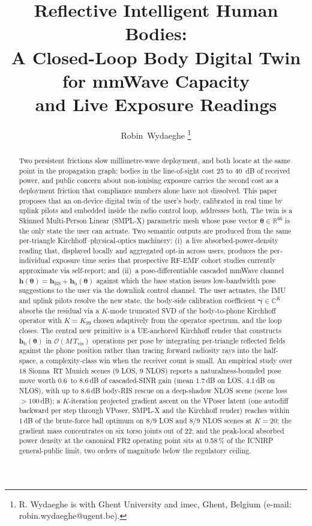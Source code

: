 \documentclass[journal,twocolumn,10pt]{IEEEtran}
\title{Reflective Intelligent Human Bodies:\\
A Closed-Loop Body Digital Twin for mmWave Capacity\\
and Live Exposure Readings}
\author{Robin~Wydaeghe%
  \thanks{R. Wydaeghe is with Ghent University and imec, Ghent, Belgium
  (e-mail: robin.wydaeghe@ugent.be).}}
\theoremstyle{plain}
\theoremstyle{definition}
\theoremstyle{remark}
\newcommand{\hh}{\bm{h}}
\newcommand{\thetab}{\bm{\theta}}
\newcommand{\gammab}{\bm{\gamma}}
\newcommand{\hBS}{\bm{h}_{\mathrm{BS}}}
\newcommand{\hbody}{\bm{h}_{\mathrm{b}}}
\newcommand{\Complex}{\mathbb{C}}
\newcommand{\Reals}{\mathbb{R}}
\begin{document}
\maketitle

\begin{abstract}
Two persistent frictions slow millimetre-wave deployment, and both
locate at the same point in the propagation graph: bodies in the
line-of-sight cost 25 to 40~dB of received power, and public concern
about non-ionising exposure carries the second cost as a deployment
friction that compliance numbers alone have not dissolved. This paper
proposes that an on-device digital twin of the user's body, calibrated
in real time by uplink pilots and embedded inside the radio control
loop, addresses both. The twin is a Skinned Multi-Person Linear (SMPL-X)
parametric mesh whose pose vector $\thetab \in \Reals^{66}$ is the only
state the user can actuate. Two semantic outputs are produced from the
same per-triangle Kirchhoff--physical-optics machinery: (i)~a live
absorbed-power-density reading that, displayed locally and aggregated
opt-in across users, produces the per-individual exposure time series
that prospective RF-EMF cohort studies currently approximate via
self-report; and (ii)~a pose-differentiable cascaded mmWave channel
$\hh(\thetab) = \hBS + \hbody(\thetab)$ against which the base
station issues low-bandwidth pose suggestions to the user via the
downlink control channel. The user actuates, the IMU and uplink pilots
resolve the new state, the body-side calibration coefficient
$\gammab \in \Complex^{K}$ absorbs the residual via a $K$-mode
truncated SVD of the body-to-phone Kirchhoff operator with
$K = K_{99}$ chosen adaptively from the operator spectrum, and the
loop closes. The central new primitive is a UE-anchored Kirchhoff
render that constructs $\hbody(\thetab)$ in $\mathcal{O}(M\,T_{\mathrm{vis}})$
operations per pose by integrating per-triangle reflected fields against
the phone position rather than tracing forward radiosity rays into the
half-space, a complexity-class win when the receiver count is small.
An empirical study over $18$ Sionna~RT Munich scenes ($9$ LOS,
$9$ NLOS) reports a naturalness-bounded pose move worth $0.6$~to
$8.6\,$dB of cascaded-SINR gain (mean $1.7\,$dB on LOS, $4.1\,$dB
on NLOS), with up to $8.6\,$dB body-RIS rescue on a deep-shadow
NLOS scene (scene loss $> 100\,$dB); a $K$-iteration projected
gradient ascent on the VPoser latent (one autodiff backward per
step through VPoser, SMPL-X and the Kirchhoff render) reaches
within $1\,$dB of the brute-force ball optimum on $8/9$ LOS and
$8/9$ NLOS scenes at $K = 20$;
the gradient mass concentrates on six torso joints out of 22; and the
peak-local absorbed power density at the canonical FR2 operating point
sits at 0.58\,\% of the ICNIRP general-public limit, two orders of
magnitude below the regulatory ceiling.
\end{abstract}
\end{document}
